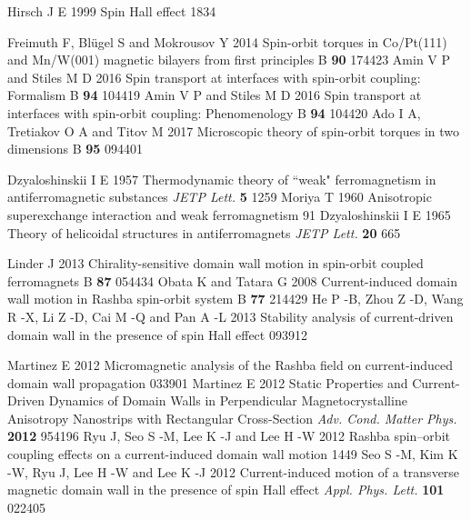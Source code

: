 \documentclass[12pt]{iopart}
\begin{document}
\begin{thebibliography}{99}
 Hirsch J E 1999 Spin Hall effect  1834

 Freimuth F, Bl\"{u}gel S and Mokrousov Y 2014 Spin-orbit torques in Co/Pt(111) and Mn/W(001) magnetic bilayers from first principles \PR B {\bf 90} 174423
 Amin V P and Stiles M D 2016 Spin transport at interfaces with spin-orbit coupling: Formalism \PR B {\bf 94} 104419
 Amin V P and Stiles M D 2016 Spin transport at interfaces with spin-orbit coupling: Phenomenology \PR B {\bf 94} 104420
 Ado I A, Tretiakov O A and Titov M 2017 Microscopic theory of spin-orbit torques in two dimensions \PR B {\bf 95} 094401

 Dzyaloshinskii I E 1957 Thermodynamic theory of ``weak" ferromagnetism in antiferromagnetic substances {\it JETP Lett.} {\bf 5} 1259
 Moriya T 1960 Anisotropic superexchange interaction and weak ferromagnetism  91
 Dzyaloshinskii I E 1965 Theory of helicoidal structures in antiferromagnets {\it JETP Lett.} {\bf 20} 665



 Linder J 2013 Chirality-sensitive domain wall motion in spin-orbit coupled ferromagnets \PR B {\bf 87} 054434
 Obata K and Tatara G 2008 Current-induced domain wall motion in Rashba spin-orbit system \PR B {\bf 77} 214429
 He P -B, Zhou Z -D, Wang R -X, Li Z -D, Cai M -Q and Pan A -L 2013 Stability analysis of current-driven domain wall in the presence of spin Hall effect  093912

 Martinez E 2012 Micromagnetic analysis of the Rashba field on current-induced domain wall propagation  033901
 Martinez E 2012 Static Properties and Current-Driven Dynamics of Domain Walls in Perpendicular Magnetocrystalline Anisotropy Nanostrips with Rectangular Cross-Section {\it Adv. Cond. Matter Phys.} {\bf 2012} 954196
 Ryu J, Seo S -M, Lee K -J and Lee H -W 2012 Rashba spin–orbit coupling effects on a current-induced domain wall motion  1449
 Seo S -M, Kim K -W, Ryu J, Lee H -W and Lee K -J 2012 Current-induced motion of a transverse magnetic domain wall in the presence of spin Hall effect {\it Appl. Phys. Lett.} {\bf 101} 022405


\end{thebibliography}
\end{document}
